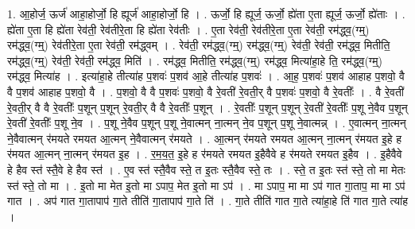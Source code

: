\documentclass[17pt]{extarticle}
\begin{document}
1. आ॒होर्ज॒ ऊर्ज॑ आहा॒होर्जो॒ हि ह्यूर्ज॑ आहा॒होर्जो॒ हि । . ऊर्जो॒ हि ह्यूर्ज॒ ऊर्जो॒ ह्ये॑ता ए॒ता ह्यूर्ज॒ ऊर्जो॒ ह्ये॑ताः । . ह्ये॑ता ए॒ता हि ह्ये॑ता रेव॑ती॒ रेव॑तीरे॒ता हि ह्ये॑ता रेव॑तीः । . ए॒ता रेव॑ती॒ रेव॑तीरे॒ता ए॒ता रेव॑ती॒ रम॑द्ध्व॒(ग्म्॒) रम॑द्ध्व॒(ग्म्॒) रेव॑तीरे॒ता ए॒ता रेव॑ती॒ रम॑द्ध्वम् । . रेव॑ती॒ रम॑द्ध्व॒(ग्म्॒) रम॑द्ध्व॒(ग्म्॒) रेव॑ती॒ रेव॑ती॒ रम॑द्ध्व॒ मितीति॒ रम॑द्ध्व॒(ग्म्॒) रेव॑ती॒ रेव॑ती॒ रम॑द्ध्व॒ मिति॑ । . रम॑द्ध्व॒ मितीति॒ रम॑द्ध्व॒(ग्म्॒) रम॑द्ध्व॒ मित्या॑हा॒हे ति॒ रम॑द्ध्व॒(ग्म्॒) रम॑द्ध्व॒ मित्या॑ह । . इत्या॑हा॒हे तीत्या॑ह प॒शवः॑ प॒शव॑ आ॒हे तीत्या॑ह प॒शवः॑ । . आ॒ह॒ प॒शवः॑ प॒शव॑ आहाह प॒शवो॒ वै वै प॒शव॑ आहाह प॒शवो॒ वै । . प॒शवो॒ वै वै प॒शवः॑ प॒शवो॒ वै रे॒वती॑ रे॒वती॒र् वै प॒शवः॑ प॒शवो॒ वै रे॒वतीः᳚ । . वै रे॒वती॑ रे॒वती॒र् वै वै रे॒वतीः᳚ प॒शून् प॒शून् रे॒वती॒र् वै वै रे॒वतीः᳚ प॒शून् । . रे॒वतीः᳚ प॒शून् प॒शून् रे॒वती॑ रे॒वतीः᳚ प॒शू ने॒वैव प॒शून् रे॒वती॑ रे॒वतीः᳚ प॒शू ने॒व । . प॒शू ने॒वैव प॒शून् प॒शू ने॒वात्मन् ना॒त्मन् ने॒व प॒शून् प॒शू ने॒वात्मन्न् । . ए॒वात्मन् ना॒त्मन् ने॒वैवात्मन् र॑मयते रमयत आ॒त्मन् ने॒वैवात्मन् र॑मयते । . आ॒त्मन् र॑मयते रमयत आ॒त्मन् ना॒त्मन् र॑मयत इ॒हे ह र॑मयत आ॒त्मन् ना॒त्मन् र॑मयत इ॒ह । . र॒म॒य॒त॒ इ॒हे ह र॑मयते रमयत इ॒हैवैवे ह र॑मयते रमयत इ॒हैव । . इ॒हैवैवे हे हैव स्त॑ स्तै॒वे हे हैव स्त॑ । . ए॒व स्त॑ स्तै॒वैव स्ते॒ त इ॒तः स्तै॒वैव स्ते॒ तः । . स्ते॒ त इ॒तः स्त॑ स्ते॒ तो मा मेतः स्त॑ स्ते॒ तो मा । . इ॒तो मा मेत इ॒तो मा ऽपाप॒ मेत इ॒तो मा ऽप॑ । . मा ऽपाप॒ मा मा ऽप॑ गात गा॒ताप॒ मा मा ऽप॑ गात । . अप॑ गात गा॒तापाप॑ गा॒ते तीति॑ गा॒तापाप॑ गा॒ते ति॑ । . गा॒ते तीति॑ गात गा॒ते त्या॑हा॒हे ति॑ गात गा॒ते त्या॑ह । \newline
\end{document}
